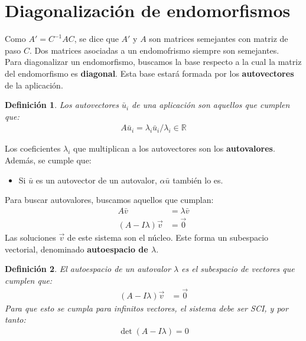 \documentclass{article}
\newtheorem{defin}{Definición}
\begin{document}
\section{Diagonalización de endomorfismos}
Como $A'=C^{-1}AC$, se dice que $A'$ y $A$ son matrices semejantes con matriz de paso $C$. Dos matrices
asociadas a un endomofrismo siempre son semejantes.\\
Para diagonalizar un endomorfismo, buscamos la base respecto a la cual la matriz del endomorfismo es
\textbf{diagonal}. Esta base estará formada por los \textbf{autovectores} de la aplicación.
\begin{defin}
    Los autovectores $\bar{u}_{i}$ de una aplicación son aquellos que cumplen que:
    \begin{equation}
        \begin{split}
            A \bar{u}_{i} = \lambda_{i} \bar{u}_i / \lambda_{i} \in \mathbb{R}
        \end{split}
    \end{equation}
\end{defin}
Los coeficientes $\lambda _{i}$ que multiplican a los autovectores son los \textbf{autovalores}.\\
Además, se cumple que:
\begin{itemize}
    \item Si $\bar{u}$ es un autovector de un autovalor, $\alpha \bar{u}$ también lo es.
\end{itemize}
Para buscar autovalores, buscamos aquellos que cumplan:
\begin{equation}
    \begin{split}
        A \bar{v} &= \lambda \bar{v}\\
        (A - I\lambda ) \vec{v} &= \vec{0}
    \end{split}
\end{equation}
Las soluciones $\vec{v}$ de este sistema son el núcleo. Este forma un subespacio vectorial, denominado
\textbf{autoespacio de $\lambda $}.
\begin{defin}
    El autoespacio de un autovalor $\lambda $ es el subespacio de vectores que cumplen que:
    \begin{equation}
        \begin{split}
            (A - I\lambda ) \vec{v} &= \vec{0}
        \end{split}
    \end{equation}
    Para que esto se cumpla para infinitos vectores, el sistema debe ser SCI, y por tanto:
    \begin{equation}
        \begin{split}
            \boxed{\det (A - I\lambda) = 0}
        \end{split}
    \end{equation}
\end{defin}
\end{document}
